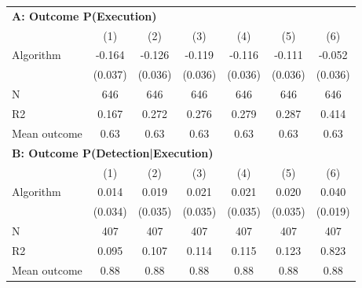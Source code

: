 \begin{tabular}{lcccccc} \toprule
\multicolumn{7}{l}{\textbf{A: Outcome P(Execution)}} \\ \multicolumn{1}{l}{} & (1) & (2) & (3) & (4) & (5) & (6) \\ \midrule
Algorithm   &      -0.164\sym{***}&      -0.126\sym{***}&      -0.119\sym{***}&      -0.116\sym{***}&      -0.111\sym{***}&      -0.052         \\
            &     (0.037)         &     (0.036)         &     (0.036)         &     (0.036)         &     (0.036)         &     (0.036)         \\
\midrule
N           &         646         &         646         &         646         &         646         &         646         &         646         \\
R2          &       0.167         &       0.272         &       0.276         &       0.279         &       0.287         &       0.414         \\
Mean outcome&        0.63         &        0.63         &        0.63         &        0.63         &        0.63         &        0.63         \\

\midrule \multicolumn{7}{l}{\textbf{B: Outcome P(Detection|Execution)}} \\ \multicolumn{1}{l}{} & (1) & (2) & (3) & (4) & (5) & (6) \\ \midrule
Algorithm   &       0.014         &       0.019         &       0.021         &       0.021         &       0.020         &       0.040\sym{**} \\
            &     (0.034)         &     (0.035)         &     (0.035)         &     (0.035)         &     (0.035)         &     (0.019)         \\
\midrule
N           &         407         &         407         &         407         &         407         &         407         &         407         \\
R2          &       0.095         &       0.107         &       0.114         &       0.115         &       0.123         &       0.823         \\
Mean outcome&        0.88         &        0.88         &        0.88         &        0.88         &        0.88         &        0.88         \\


\end{tabular}
